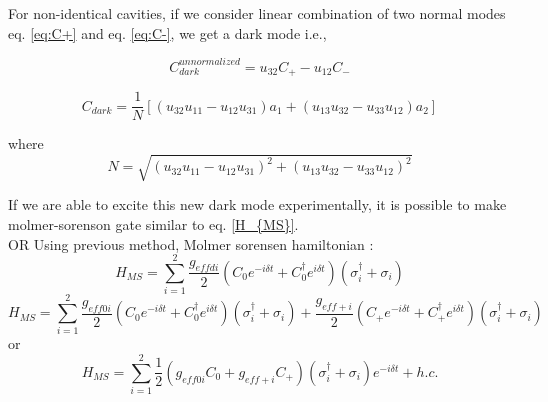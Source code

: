 \documentclass{article}
\begin{document}


For non-identical cavities, if we consider linear combination of two normal modes eq. \ref{eq:C+} and eq. \ref{eq:C-}, we get a dark mode i.e.,

\begin{equation}
    C_{dark}^{unnormalized} = u_{32} C_+ - u_{12} C_-
\end{equation}

\begin{equation}
    C_{dark} = \frac{1}{N} \left[(u_{32} u_{11} - u_{12} u_{31}) a_{1} + (u_{13} u_{32} - u_{33} u_{12}) a_{2} \right]
\end{equation}

where 
\begin{equation}
   N= \sqrt{(u_{32} u_{11} - u_{12} u_{31})^2 + (u_{13} u_{32} - u_{33} u_{12})^2}
\end{equation}

If we are able to excite this new dark mode experimentally, it is possible to make molmer-sorenson gate similar to eq. \ref{H_{MS}}. \\

    OR 
Using previous method, 
Molmer sorensen hamiltonian :
\begin{equation}
    H_{MS} = \sum_{i=1}^{2} \frac{g_{effdi}}{2} (C_0 e^{-i \delta t} + C_0^{\dagger} e^{i \delta t}) (\sigma^{\dagger}_i+\sigma_i) 
\end{equation}
\begin{equation}
     H_{MS} =  \sum_{i=1}^{2} \frac{g_{eff0i}}{2} (C_0 e^{-i \delta t} + C_0^{\dagger} e^{i \delta t}) (\sigma^{\dagger}_i+\sigma_i)  + \frac{g_{eff+i}}{2} (C_+ e^{-i \delta t} + C_+^{\dagger} e^{i \delta t}) (\sigma^{\dagger}_i+\sigma_i) 
\end{equation}
or
\begin{equation}
     H_{MS} =  \sum_{i=1}^{2} \frac{1}{2} (g_{eff0i} C_0 + g_{eff+i} C_+ )(\sigma^{\dagger}_i+\sigma_i)  e^{-i \delta t} + h.c.
\end{equation}
\end{document}
